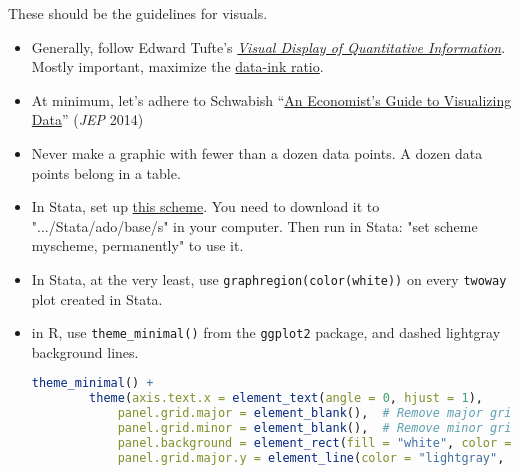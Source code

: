 These should be the guidelines for visuals. 
\begin{itemize}
	\item Generally, follow Edward Tufte's \href{https://www.edwardtufte.com/tufte/books_vdqi}{\textit{Visual Display of Quantitative Information}}. 
	Mostly important, maximize the \href{https://www.coursera.org/learn/python-plotting/lecture/qFnP9/graphical-heuristics-data-ink-ratio-edward-tufte}{data-ink ratio}.
	\item At minimum, let's adhere to Schwabish ``\href{https://www.aeaweb.org/articles?id=10.1257/jep.28.1.209}{An Economist's Guide to Visualizing Data}'' (\textit{JEP} 2014) 
	\item Never make a graphic with fewer than a dozen data points. A dozen data points belong in a table.
	\item In Stata, set up \href{https://www.jmorenomedina.com/s/scheme-myscheme.scheme}{this scheme}. You need to download it
	to  ".../Stata/ado/base/s" in your computer. Then run in Stata: "set scheme myscheme, permanently" to use it.
	\item In Stata, at the very least, use \texttt{graphregion(color(white))} on every \texttt{twoway} plot created in Stata.
	\item in R, use \texttt{theme\_minimal()} from the \texttt{ggplot2} package, and dashed lightgray background lines. 
	\begin{lstlisting}[language=R]
		theme_minimal() +
		theme(axis.text.x = element_text(angle = 0, hjust = 1),
			panel.grid.major = element_blank(),  # Remove major grid lines
			panel.grid.minor = element_blank(),  # Remove minor grid lines
			panel.background = element_rect(fill = "white", color = NA),  # Set background color to white without border
			panel.grid.major.y = element_line(color = "lightgray", linetype = "dashed", linewidth = 0.2)) + # Add light gray dashed lines for y-axis ticks 
	\end{lstlisting}
\end{itemize}